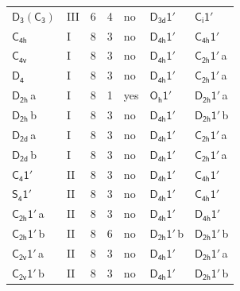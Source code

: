 \documentclass[10pt,a4paper]{article}
\numberwithin{equation}{section}
\newcommand{\grp}[1]{\mathsf{#1}}
\newcommand{\clsletter}[1]{\,{\scriptsize\color{black!55}#1}}
\begin{document}
{\begin{longtable}{@{}llrrlll@{}}
\href{D3-C3.pdf}{$\grp{D_{3}}(\grp{C_{3}})$} & III & 6 & 4 & no & \href{D3d-1p.pdf}{$\grp{D_{3d}1'}$} & \href{S2-1p.pdf}{$\grp{C_{i}1'}$}\\
\href{../../../rotation/data/pdf/C4h.pdf}{$\grp{C_{4h}}$} & I & 8 & 3 & no & \href{D4h-1p.pdf}{$\grp{D_{4h}1'}$} & \href{C4h-1p.pdf}{$\grp{C_{4h}1'}$}\\
\href{../../../rotation/data/pdf/C4v.pdf}{$\grp{C_{4v}}$} & I & 8 & 3 & no & \href{D4h-1p.pdf}{$\grp{D_{4h}1'}$} & \href{C2h-1p.pdf}{$\grp{C_{2h}1'}$}\clsletter{a}\\
\href{../../../rotation/data/pdf/D4.pdf}{$\grp{D_{4}}$} & I & 8 & 3 & no & \href{D4h-1p.pdf}{$\grp{D_{4h}1'}$} & \href{C2h-1p.pdf}{$\grp{C_{2h}1'}$}\clsletter{a}\\
\href{../../../rotation/data/pdf/D2h.pdf}{$\grp{D_{2h}}$}\clsletter{a} & I & 8 & 1 & yes & \href{Oh-1p.pdf}{$\grp{O_{h}1'}$} & \href{D2h-1p.pdf}{$\grp{D_{2h}1'}$}\clsletter{a}\\
\href{../../../rotation/data/pdf/D2h.pdf}{$\grp{D_{2h}}$}\clsletter{b} & I & 8 & 3 & no & \href{D4h-1p.pdf}{$\grp{D_{4h}1'}$} & \href{D2h-1p.pdf}{$\grp{D_{2h}1'}$}\clsletter{b}\\
\href{../../../rotation/data/pdf/D2d.pdf}{$\grp{D_{2d}}$}\clsletter{a} & I & 8 & 3 & no & \href{D4h-1p.pdf}{$\grp{D_{4h}1'}$} & \href{C2h-1p.pdf}{$\grp{C_{2h}1'}$}\clsletter{a}\\
\href{../../../rotation/data/pdf/D2d.pdf}{$\grp{D_{2d}}$}\clsletter{b} & I & 8 & 3 & no & \href{D4h-1p.pdf}{$\grp{D_{4h}1'}$} & \href{C2h-1p.pdf}{$\grp{C_{2h}1'}$}\clsletter{a}\\
\href{C4-1p.pdf}{$\grp{C_{4}1'}$} & II & 8 & 3 & no & \href{D4h-1p.pdf}{$\grp{D_{4h}1'}$} & \href{C4h-1p.pdf}{$\grp{C_{4h}1'}$}\\
\href{S4-1p.pdf}{$\grp{S_{4}1'}$} & II & 8 & 3 & no & \href{D4h-1p.pdf}{$\grp{D_{4h}1'}$} & \href{C4h-1p.pdf}{$\grp{C_{4h}1'}$}\\
\href{C2h-1p.pdf}{$\grp{C_{2h}1'}$}\clsletter{a} & II & 8 & 3 & no & \href{D4h-1p.pdf}{$\grp{D_{4h}1'}$} & \href{D4h-1p.pdf}{$\grp{D_{4h}1'}$}\\
\href{C2h-1p.pdf}{$\grp{C_{2h}1'}$}\clsletter{b} & II & 8 & 6 & no & \href{D2h-1p.pdf}{$\grp{D_{2h}1'}$}\clsletter{b} & \href{D2h-1p.pdf}{$\grp{D_{2h}1'}$}\clsletter{b}\\
\href{C2v-1p.pdf}{$\grp{C_{2v}1'}$}\clsletter{a} & II & 8 & 3 & no & \href{D4h-1p.pdf}{$\grp{D_{4h}1'}$} & \href{D2h-1p.pdf}{$\grp{D_{2h}1'}$}\clsletter{a}\\
\href{C2v-1p.pdf}{$\grp{C_{2v}1'}$}\clsletter{b} & II & 8 & 3 & no & \href{D4h-1p.pdf}{$\grp{D_{4h}1'}$} & \href{D2h-1p.pdf}{$\grp{D_{2h}1'}$}\clsletter{b}\\

\end{longtable}}
\end{document}

